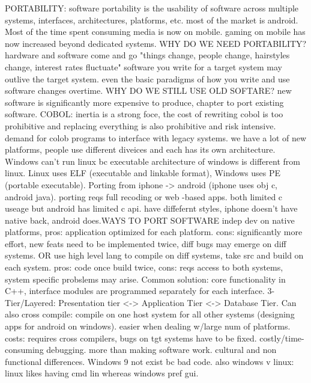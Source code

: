 \documentclass[10pt]{article}
\begin{document}
\begin{landscape}
\begin{multicols*}{6}
PORTABILITY:
software portability is the usability of software across multiple systems, interfaces, architectures, platforms, etc. most of the market is android. Most of the time spent consuming media is now on mobile. gaming on mobile has now increased beyond dedicated systems. WHY DO WE NEED PORTABILITY? hardware and software come and go "things change, people change, hairstyles change, interest rates fluctuate" software you write for a target system may outlive the target system. even the basic paradigms of how you write and use software changes overtime. WHY DO WE STILL USE OLD SOFTARE? new software is significantly more expensive to produce, chapter to port existing software. COBOL: inertia is a strong foce, the cost of rewriting cobol is too prohibitive and replacing everything is also prohibitive and risk intensive. demand for colob programs to interface with legacy systems. we have a lot of new platforms, people use different diveices and each has its own architecture. Windows can't run linux bc executable architecture of windows is different from linux. Linux uses ELF (executable and linkable format), Windows uses PE (portable executable). Porting from iphone -> android (iphone uses obj c, android java). porting reqs full recoding or web -based apps. both limited c useage but android has limited c api. have diffefernt styles, iphone doesn't have native back, android does.WAYS TO PORT SOFTWARE indep dev on native platforms, pros: application optimized for each platform. cons: significantly more effort, new feats need to be implemented twice, diff bugs may emerge on diff systems. OR use high level lang to compile on diff systems, take src and build on each system. pros: code once build twice, cons: reqs access to both systems, system specific probslems may arise. Common solution: core functionality in C++, interface modules are programmed separately for each interface. 3-Tier/Layered: Presentation tier <-> Application Tier <-> Database Tier. Can also cross compile: compile on one host system for all other systems (designing apps for android on windows). easier when dealing w/large num of platforms. costs: requires cross compilers, bugs on tgt systems have to be fixed. costly/time-consuming debugging. more than making software work. cultural and non functional differences. Windows 9 not exist bc bad code. also windows v linux: linux likes having cmd lin whereas windows pref gui. 


\end{multicols*}
\end{landscape}
\end{document}
